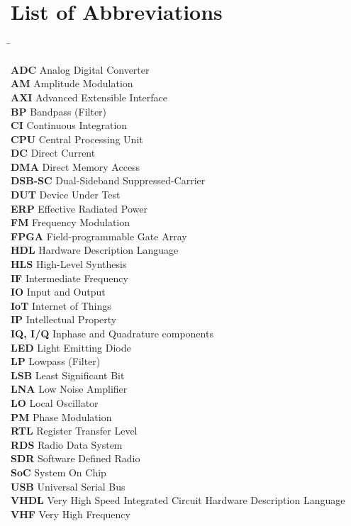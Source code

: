\chapter{List of Abbreviations}
\label{cha:listabbrev}

\begin{tabbing}
\hspace{25 mm}\=\kill

\textbf{ADC}       \> Analog Digital Converter\\
\textbf{AM}        \> Amplitude Modulation\\
\textbf{AXI}       \> Advanced Extensible Interface\\
\textbf{BP}        \> Bandpass (Filter)\\
\textbf{CI}        \> Continuous Integration\\
\textbf{CPU}       \> Central Processing Unit\\
\textbf{DC}        \> Direct Current\\
\textbf{DMA}       \> Direct Memory Access\\
\textbf{DSB-SC}    \> Dual-Sideband Suppressed-Carrier\\
\textbf{DUT}       \> Device Under Test\\
\textbf{ERP}       \> Effective Radiated Power\\
\textbf{FM}        \> Frequency Modulation\\
\textbf{FPGA}      \> Field-programmable Gate Array\\
\textbf{HDL}       \> Hardware Description Language\\
\textbf{HLS}       \> High-Level Synthesis\\
\textbf{IF}        \> Intermediate Frequency\\
\textbf{IO}        \> Input and Output\\
\textbf{IoT}       \> Internet of Things\\
\textbf{IP}        \> Intellectual Property\\
\textbf{IQ, I/Q}   \> Inphase and Quadrature components\\
\textbf{LED}       \> Light Emitting Diode\\
\textbf{LP}        \> Lowpass (Filter)\\
\textbf{LSB}       \> Least Significant Bit\\
\textbf{LNA}       \> Low Noise Amplifier\\
\textbf{LO}        \> Local Oscillator\\
\textbf{PM}        \> Phase Modulation\\
\textbf{RTL}       \> Register Transfer Level\\
\textbf{RDS}       \> Radio Data System\\
\textbf{SDR}       \> Software Defined Radio\\
\textbf{SoC}       \> System On Chip\\
\textbf{USB}       \> Universal Serial Bus\\
\textbf{VHDL}      \> Very High Speed Integrated Circuit Hardware Description Language\\
\textbf{VHF}       \> Very High Frequency\\

\end{tabbing}
